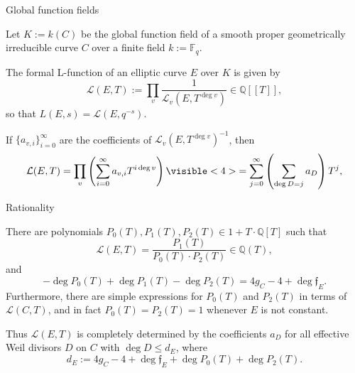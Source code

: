 \documentclass[10pt]{beamer}
\begin{document}
\begin{frame}[t]{Global function fields}

Let $ K := k(C) $ be the global function field of a smooth proper geometrically irreducible curve $ C $ over a finite field $ k := \mathbb{F}_q $.

\pause

\vspace{0.5cm} The formal L-function of an elliptic curve $ E $ over $ K $ is given by
$$ \mathcal{L}(E, T) := \prod_v \dfrac{1}{\mathcal{L}_v(E, T^{\deg v})} \in \mathbb{Q}[[T]], $$
so that $ L(E, s) = \mathcal{L}(E, q^{-s}) $.

\pause

\vspace{0.5cm} If $ \{a_{v, i}\}_{i = 0}^\infty $ are the coefficients of $ \mathcal{L}_v(E, T^{\deg v})^{-1} $, then
$$ \mathcal{L}(E, T) = \prod_v \left(\sum_{i = 0}^\infty a_{v, i}T^{i\deg v}\right) \visible<4>{= \sum_{j = 0}^\infty \left(\sum_{\deg D = j} a_D\right)T^j,} $$%

\end{frame}

\begin{frame}[t]{Rationality}

\begin{corollary}
There are polynomials $ P_0(T), P_1(T), P_2(T) \in 1 + T \cdot \mathbb{Q}[T] $ such that
$$ \mathcal{L}(E, T) = \dfrac{P_1(T)}{P_0(T) \cdot P_2(T)} \in \mathbb{Q}(T), $$
and
$$ -\deg P_0(T) + \deg P_1(T) - \deg P_2(T) = 4g_C - 4 + \deg\mathfrak{f}_E. $$
Furthermore, there are simple expressions for $ P_0(T) $ and $ P_2(T) $ in terms of $ \mathcal{L}(C, T) $, and in fact $ P_0(T) = P_2(T) = 1 $ whenever $ E $ is not constant.
\end{corollary}

\pause

\vspace{0.5cm} Thus $ \mathcal{L}(E, T) $ is completely determined by the coefficients $ a_D $ for all effective Weil divisors $ D $ on $ C $ with $ \deg D \le d_E $, where
$$ d_E := 4g_C - 4 + \deg\mathfrak{f}_E + \deg P_0(T) + \deg P_2(T). $$

\end{frame}
\end{document}
